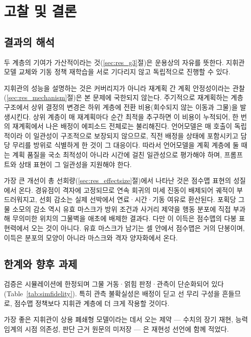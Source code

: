 \section{고찰 및 결론}
\label{sec:discussion}

\subsection{결과의 해석}

두 계층의 기여가 가산적이라는 것(\ref{sec:res_g3}절)은 운용상의 자유를 뜻한다. 지휘관 모델
교체와 기동 정책 재학습을 서로 기다리지 않고 독립적으로 진행할 수 있다.

지휘관의 성능을 설명하는 것은 커버리지가 아니라 재계획 간 계획 안정성이라는
관찰(\ref{sec:res_mechanism}절)은 본 문제에 국한되지 않는다. 주기적으로 재계획하는 계층
구조에서 상위 결정의 변경은 하위 계층에 전환 비용(회수되지 않는 이동과 그물)을
발생시킨다. 상위 계층이 매 재계획마다 순간 최적을 추구하면 이 비용이 누적되어, 한 번의 재계획에서 나은
배정이 에피소드 전체로는 불리해진다. 언어모델은 매 호출이 독립적이라 이 일관성이 구조적으로 보장되지
않으므로, 직전 배정을 상태에 포함시키고 담당 무리를 방위로 식별하게 한 것이 그 대응이다.
따라서 언어모델을 계획 계층에 둘 때는 계획 품질을 국소 최적성이 아니라 시간에 걸친
일관성으로 평가해야 하며, 프롬프트와 상태 표현이 그 일관성을 지원해야 한다.

가장 큰 개선이 총 선회량(\ref{sec:res_effectsize}절)에서 나타난 것은 점수맵 표현의 성질에서
온다. 경유점이 격자에 고정되므로 연속 회귀의 미세 진동이 배제되어 궤적이 부드러워지고, 선회
감소는 실제 선박에서 연료·시간·기동 여유로 환산된다. 포획당 그물 소모의 감소 역시 유효 마스크가 방위 조건과 사거리 제약을 행동 분포에 직접
부과해 무의미한 위치의 그물벽을 애초에 배제한 결과다. 다만 이 이득은 점수맵의 다봉 표현력에서 오는 것이 아니다. 유효 마스크가 남기는 셀
안에서 점수맵은 거의 단봉이며, 이득은 분포의 모양이 아니라 마스크와 격자 양자화에서 온다.

\subsection{한계와 향후 과제}
\label{sec:limitations}

검증은 시뮬레이션에 한정되며 그물 거동·얽힘 판정·관측이 단순화되어
있다(Table~\ref{tab:simfidelity}). 특히 관측 불확실성은 배정이 딛고 선 무리 구성을 흔들므로,
점수맵 정책보다 지휘관 계층에 더 크게 작용할 것이다.

가장 좋은 지휘관이 상용 폐쇄형 모델이라는 데서 오는 제약 --- 수치의 장기 재현, 능력 임계의
시점 의존성, 판단 근거 원문의 미저장 --- 은 재현성 선언에 함께 적었다.

